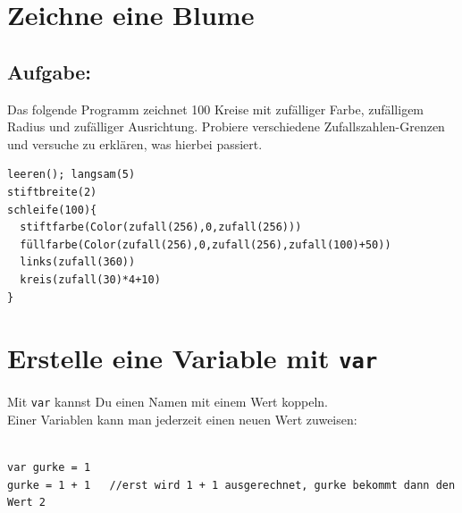\chapter{Zeichne eine Blume}\section*{\color{BrickRed}Aufgabe:}
Das folgende Programm zeichnet 100 Kreise mit zufälliger Farbe, zufälligem Radius und zufälliger Ausrichtung. Probiere verschiedene Zufallszahlen-Grenzen und versuche zu erklären, was hierbei passiert.

  

\begin{lstlisting}[basicstyle={\ttfamily\fontsize{16}{19}\selectfont},numbers=none]
leeren(); langsam(5)
stiftbreite(2)
schleife(100){
  stiftfarbe(Color(zufall(256),0,zufall(256)))
  füllfarbe(Color(zufall(256),0,zufall(256),zufall(100)+50))
  links(zufall(360))
  kreis(zufall(30)*4+10)
}
\end{lstlisting}
        
\chapter{Erstelle eine Variable mit \lstinline{var}}Mit \lstinline{var} kannst Du einen Namen mit einem Wert koppeln.\\
Einer Variablen kann man jederzeit einen neuen Wert zuweisen:

\begin{lstlisting}[numbers=none]

var gurke = 1
gurke = 1 + 1   //erst wird 1 + 1 ausgerechnet, gurke bekommt dann den Wert 2        
        
\end{lstlisting}
        

